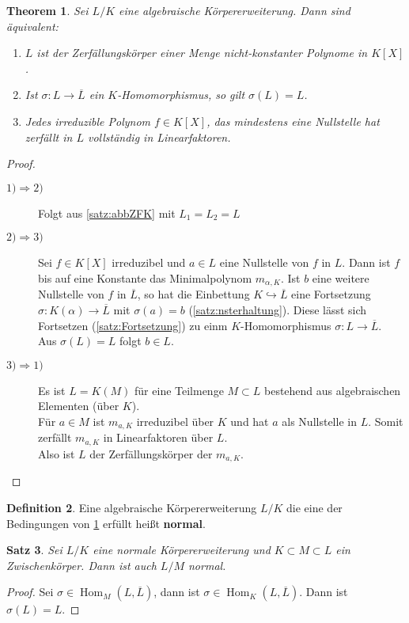 \documentclass[10pt,a4paper]{article}
\newcommand{\al}{\ensuremath{\alpha}}
\newcommand{\ol}[1]{\overline{#1}}
\newcommand{\Hom}{\operatorname{Hom}}
\theoremstyle{plain}
\newtheorem{theorem}{Theorem}[section]
\newtheorem{satz}[theorem]{Satz}
\theoremstyle{definition}
\newtheorem{definition}[theorem]{Definition}
\theoremstyle{remark}
\begin{document}
	\begin{theorem}\label{thm:zfk}
		Sei $L/K$ eine algebraische Körpererweiterung. Dann sind äquivalent:\begin{enumerate}
			\item $L$ ist der Zerfällungskörper einer Menge nicht-konstanter Polynome in $K[X]$.
			\item Ist $\sigma:L\to\ol L$ ein $K$-Homomorphismus, so gilt $\sigma(L)=L$.
			\item Jedes irreduzible Polynom $f\in K[X]$, das mindestens eine Nullstelle hat zerfällt in $L$ vollständig in Linearfaktoren.
		\end{enumerate}
	\end{theorem}
	\begin{proof}
		\begin{description}
			\item[$1)\Rightarrow 2)$] Folgt aus \ref{satz:abbZFK} mit $L_1=L_2=L$
			\item[$2)\Rightarrow 3)$] Sei $f\in K[X]$ irreduzibel und $a\in L$ eine Nullstelle von $f$ in $L$. Dann ist $f$ bis auf eine Konstante das Minimalpolynom $m_{\al,K}$. Ist $b$ eine weitere Nullstelle von $f$ in $\ol L$, so hat die Einbettung $K\hookrightarrow\ol L$ eine Fortsetzung $\sigma:K(\al)\to\ol L$ mit $\sigma(a)=b$ (\ref{satz:nsterhaltung}). Diese lässt sich Fortsetzen (\ref{satz:Fortsetzung}) zu einm $K$-Homomorphismus $\sigma:L\to \ol L$.\\
			Aus $\sigma(L)=L$ folgt $b\in L$.
			\item[$3)\Rightarrow1)$] Es ist $L=K(M)$ für eine Teilmenge $M\subset L$ bestehend aus algebraischen Elementen (über $K$).\\
			Für $a\in M$ ist $m_{a,K}$ irreduzibel über $K$ und hat $a$ als Nullstelle in $L$. Somit zerfällt $m_{a,K}$ in Linearfaktoren über $L$.\\
			Also ist $L$ der Zerfällungskörper der $m_{a,K}$.
		\end{description}
	\end{proof}

	\begin{definition}
		Eine algebraische Körpererweiterung $L/K$ die eine der Bedingungen von \ref{thm:zfk} erfüllt heißt \textbf{normal}.
	\end{definition}

	\begin{satz}
		Sei $L/K$ eine normale Körpererweiterung und $K\subset M\subset L$ ein Zwischenkörper. Dann ist auch $L/M$ normal.
	\end{satz}
	\begin{proof}
		Sei $\sigma\in\Hom_M(L,\ol L)$, dann ist $\sigma\in \Hom_K(L,\ol L)$. Dann ist $\sigma(L)=L$.
	\end{proof}
\end{document}
